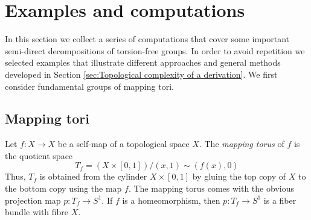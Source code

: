 \documentclass[11pt]{amsart}
\theoremstyle{plain}
\newtheorem{proposition}[theorem]{Proposition}
\theoremstyle{definition}
\newcommand{\secat}{\mathop{\rm secat}\nolimits}
\newcommand{\tc}{\mathop{\rm tc}\nolimits}
\begin{document}




\section{Examples and computations}\label{sec:Examples and computations}

In this section we collect a series of computations that cover some important semi-direct
decompositions of torsion-free groups. In order to avoid repetition we selected examples 
that illustrate 
different approaches and general methods developed in Section \ref{sec:Topological complexity 
of a derivation}. We first consider fundamental groups of mapping tori.

\subsection{Mapping tori}\label{ssec:mapping tori}

Let $f\colon X\to X$ be a self-map of a topological space $X$.  The \emph{mapping torus} of $f$ 
is the quotient space 
$$T_f=(X\times[0,1])/(x,1)\sim (f(x),0)$$
Thus, $T_f$ is obtained from the cylinder $X\times [0,1]$ by gluing the
top copy of $X$ to the bottom copy using the map $f$. The mapping torus comes 
with the obvious projection map $p\colon T_f\to S^1$. If $f$ 
is a homeomorphism, then $p\colon T_f\to S^1$ is a fiber bundle with fibre $X$.
\end{document}

